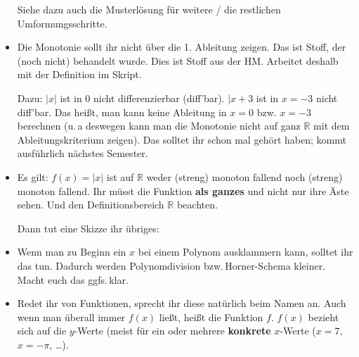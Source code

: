 \documentclass[11pt, a4paper]{article}
\newcommand{\R}{\mathbb{R}}
\newcommand{\RM}[1]{\MakeUppercase{\romannumeral #1{}}}
\begin{document}
\begin{itemize}
Siehe dazu auch die Musterlösung für weitere / die restlichen Umformungsschritte. 

\item Die Monotonie sollt ihr nicht über die 1. Ableitung zeigen. Das ist Stoff, der (noch nicht) behandelt wurde. Dies ist Stoff aus der  HM\RM{2}. Arbeitet deshalb mit der Definition im Skript. 

Dazu: $|x|$ ist in 0 nicht differenzierbar (diff'bar). $|x+3$ ist in $x = -3$ nicht diff'bar. Das heißt, man kann keine Ableitung in $x = 0$ bzw. $x = -3$ berechnen (u.\,a deswegen kann man die Monotonie nicht auf ganz $\R$ mit dem Ableitungskriterium zeigen). Das solltet ihr schon mal gehört haben; kommt ausführlich nächstes Semester.

\item Es gilt: $f(x) = |x|$ ist auf $\R$ weder (streng) monoton fallend noch (streng) monoton fallend. Ihr müsst die Funktion \textbf{als ganzes} und nicht nur ihre Äste sehen. Und den Definitionsbereich $\R$ beachten.

Dann tut eine Skizze ihr übriges:

\begin{figure}
\centering
{}
\end{figure}

\item Wenn man zu Beginn ein $x$ bei einem Polynom ausklammern kann, solltet ihr das tun. Dadurch werden Polynomdivision bzw.\,Horner-Schema kleiner. Macht euch das ggfs.\,klar.

\item Redet ihr von Funktionen, sprecht ihr diese natürlich beim Namen an. Auch wenn man überall immer $f(x)$ ließt, heißt die Funktion $f$. $f(x)$ bezieht sich auf die $y$-Werte (meist für ein oder mehrere \textbf{konkrete} $x$-Werte ($x = 7$, $x = -\pi$, \dots).


\end{itemize}
\end{document}
